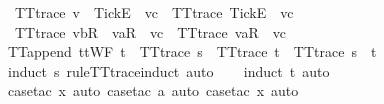 \begin{isabellebody}
{\ \ {\isachardoublequoteopen}TT{}{\isacharunderscore}trace\ {\isacharparenleft}v\ {\isacharhash}\ {\isacharbrackleft}Tick{\isacharbrackright}\isactrlsub E\ {\isacharhash}\ vc{\isacharparenright}\ {\isacharequal}\ TT{}{\isacharunderscore}trace\ {\isacharparenleft}{\isacharbrackleft}Tick{\isacharbrackright}\isactrlsub E\ {\isacharhash}\ vc{\isacharparenright}{\isachardoublequoteclose}\ {\isacharbar}\isanewline
\ \ {\isachardoublequoteopen}TT{}{\isacharunderscore}trace\ {\isacharparenleft}{\isacharbrackleft}vb{\isacharbrackright}\isactrlsub R\ {\isacharhash}\ {\isacharbrackleft}va{\isacharbrackright}\isactrlsub R\ {\isacharhash}\ vc{\isacharparenright}\ {\isacharequal}\ TT{}{\isacharunderscore}trace\ {\isacharparenleft}{\isacharbrackleft}va{\isacharbrackright}\isactrlsub R\ {\isacharhash}\ vc{\isacharparenright}{\isachardoublequoteclose}%
}%
%
\isamarkupfalse%
\ TT{}{\isacharunderscore}append{\isacharcolon}\ {\isachardoublequoteopen}ttWF\ t\ {\isasymLongrightarrow}\ TT{}{\isacharunderscore}trace\ s\ {\isasymLongrightarrow}\ TT{}{\isacharunderscore}trace\ t\ {\isasymLongrightarrow}\ TT{}{\isacharunderscore}trace\ {\isacharparenleft}s\ {\isacharat}\ t{\isacharparenright}{\isachardoublequoteclose}\isanewline
%
\isadelimproof
\ \ %
\endisadelimproof
%
\isatagproof
{}\isamarkupfalse%
\ {\isacharparenleft}induct\ s\ rule{\isacharcolon}TT{}{\isacharunderscore}trace{\isachardot}induct{\isacharcomma}\ auto{\isacharparenright}\isanewline
\ \ \isamarkupfalse%
\ {\isacharparenleft}induct\ t{\isacharcomma}\ auto{\isacharparenright}\isanewline
\ \ \isamarkupfalse%
\ {\isacharparenleft}case{\isacharunderscore}tac\ x{\isacharcomma}\ auto{\isacharcomma}\ case{\isacharunderscore}tac\ a{\isacharcomma}\ auto{\isacharcomma}\ case{\isacharunderscore}tac\ x{}{\isacharcomma}\ auto{\isacharparenright}\isanewline
\ \ \isamarkupfalse%
%
\endisatagproof
{\isafoldproof}%
%
\isadelimproof

\end{isabellebody}
